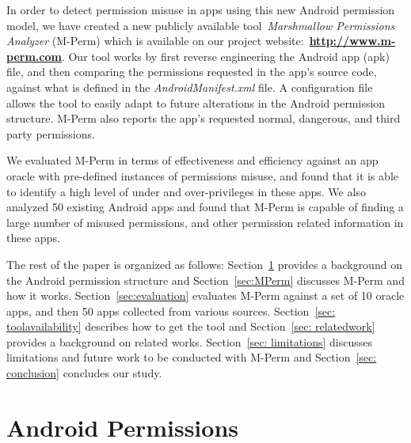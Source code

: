 \documentclass{sig-alternate-05-2015}
\begin{document}
In order to detect permission misuse in apps using this new Android permission model, we have created a new publicly available tool~\emph{Marshmallow Permissions Analyzer} (M-Perm) which is available on our project website:~\textbf{\url{http://www.m-perm.com}}. Our tool works by first reverse engineering the Android app (apk) file, and then comparing the permissions requested in the app's source code, against what is defined in the \emph{AndroidManifest.xml} file. A configuration file allows the tool to easily adapt to future alterations in the Android permission structure. M-Perm also reports the app's requested normal, dangerous, and third party permissions.

We evaluated M-Perm in terms of effectiveness and efficiency against an app oracle with pre-defined instances of permissions misuse, and found that it is able to identify a high level of under and over-privileges in these apps. We also analyzed 50 existing Android apps and found that M-Perm is capable of finding a large number of misused permissions, and other permission related information in these apps.


The rest of the paper is organized as follows: Section~\ref{sec:androidpermissions} provides a background on the Android permission structure and Section~\ref{sec:MPerm} discusses M-Perm and how it works. Section~\ref{sec:evaluation} evaluates M-Perm against a set of 10 oracle apps, and then 50 apps collected from various sources. Section~\ref{sec: toolavailability} describes how to get the tool and Section~\ref{sec: relatedwork} provides a background on related works. Section~\ref{sec: limitations} discusses limitations and future work to be conducted with M-Perm and Section~\ref{sec: conclusion} concludes our study.






\newpage
\section{Android Permissions}
\label{sec:androidpermissions}
\end{document}
